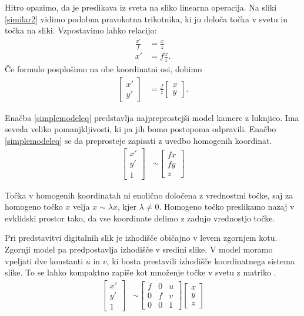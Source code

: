 \documentclass[a4paper, 12pt]{book}
\begin{document}
Hitro opazimo, da je preslikava iz sveta na sliko linearna operacija. Na sliki \ref{similar2} vidimo podobna pravokotna trikotnika, ki ju določa točka v svetu in točka na sliki. Vzpostavimo lahko relacijo:
\begin{align}
\frac{x'}{f} &= \frac{x}{z} \\
x' &= f \frac{x}{z}.
\end{align}
Če formulo posplošimo na obe koordinatni osi, dobimo
\begin{align}
\begin{bmatrix}
x' \\
y'
\end{bmatrix}
&= \frac{f}{z}
\begin{bmatrix}
x \\
y
\end{bmatrix}.
\label{simplemodeleq}
\end{align}

Enačba \eqref{simplemodeleq} predstavlja najpreprostejši model kamere z luknjico. Ima seveda veliko pomanjkljivosti, ki pa jih bomo postopoma odpravili. Enačbo \eqref{simplemodeleq} se da preprosteje zapisati z uvedbo homogenih koordinat.
\begin{align}
\begin{bmatrix}
x' \\
y' \\
1
\end{bmatrix}
&\sim 
\begin{bmatrix}
fx \\
fy \\
z
\end{bmatrix}
\end{align}

Točka v homogenih koordinatah ni enolično določena z vrednostmi točke, saj za homogeno točko $x$ velja $x \sim \lambda x$, kjer $\lambda \neq 0$. Homogeno točko preslikamo nazaj v evklidski prostor tako, da vse koordinate delimo z zadnjo vrednostjo točke. 

Pri predstavitvi digitalnih slik je izhodišče običajno v levem zgornjem kotu. Zgornji model pa predpostavlja izhodišče v sredini slike. V model moramo vpeljati dve konstanti $u$ in $v$, ki bosta prestavili izhodišče koordinatnega sistema slike. To se lahko kompaktno zapiše kot množenje točke v svetu z matriko \cite{Hartley2004, zhang2000flexible}.
\begin{align}
\begin{bmatrix}
x' \\
y' \\
1
\end{bmatrix}
&\sim
\begin{bmatrix}
f & 0 & u \\
0 & f & v \\
0 & 0 & 1
\end{bmatrix}
\begin{bmatrix}
x \\
y \\
z
\end{bmatrix}
\end{align}
\end{document}
